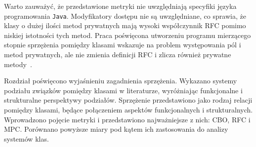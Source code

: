 Warto zauważyć, że przedstawione metryki nie uwzględniają specyfiki języka programowania \texttt{Java}.
Modyfikatory dostępu nie są uwzględniane, co sprawia, że klasy o dużej ilości metod prywatnych mają wysoki
współczynnik RFC pomimo niskiej istotności tych metod.
Praca poświęcona utworzeniu programu mierzącego stopnie sprzężenia pomiędzy klasami wskazuje na problem występowania
pól i metod prywatnych, ale nie zmienia definicji RFC i zlicza również prywatne metody~\cite{bidve2016tool}.

Rozdział poświęcono wyjaśnieniu zagadnienia sprzężenia.
Wykazano systemy podziału związków pomiędzy klasami w literaturze, wyróżniając funkcjonalne i strukturalne perspektywy
podziałów.
Sprzężenie przedstawiono jako rodzaj relacji pomiędzy klasami, będące połączeniem aspektów funkcjonalnych i
strukturalnych.
Wprowadzono pojęcie metryki i przedstawiono najważniejsze z nich: CBO, RFC i MPC\@.
Porównano powyższe miary pod kątem ich zastosowania do analizy systemów klas.